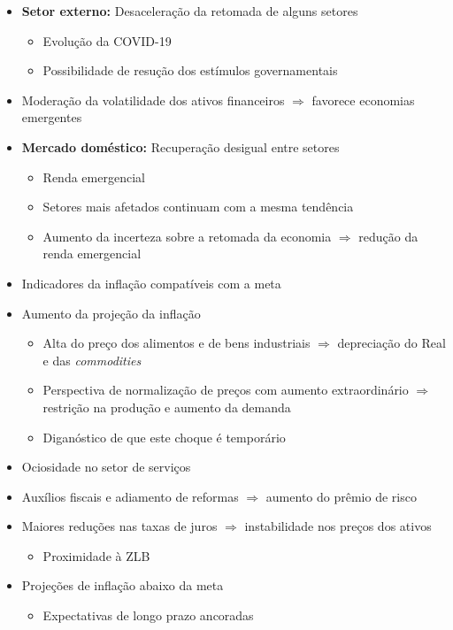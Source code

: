 \documentclass[11pt]{article}
\begin{document}
\begin{itemize}
\item \textbf{Setor externo:} Desaceleração da retomada de alguns setores
\begin{itemize}
\item Evolução da COVID-19
\item Possibilidade de resução dos estímulos governamentais
\end{itemize}
\item Moderação da volatilidade dos ativos financeiros \(\Rightarrow\) favorece economias emergentes
\item \textbf{Mercado doméstico:} Recuperação desigual entre setores
\begin{itemize}
\item Renda emergencial
\item Setores mais afetados continuam com a mesma tendência
\item Aumento da incerteza sobre a retomada da economia \(\Rightarrow\) redução da renda emergencial
\end{itemize}
\item Indicadores da inflação compatíveis com a meta
\item Aumento da projeção da inflação
\begin{itemize}
\item Alta do preço dos alimentos e de bens industriais \(\Rightarrow\) depreciação do Real e das \emph{commodities}
\item Perspectiva de normalização de preços com aumento extraordinário \(\Rightarrow\) restrição na produção e aumento da demanda
\item Diganóstico de que este choque é temporário
\end{itemize}
\item Ociosidade no setor de serviços
\item Auxílios fiscais e adiamento de reformas \(\Rightarrow\) aumento do prêmio de risco
\item Maiores reduções nas taxas de juros \(\Rightarrow\) instabilidade nos preços dos ativos
\begin{itemize}
\item Proximidade à ZLB
\end{itemize}
\item Projeções de inflação abaixo da meta
\begin{itemize}
\item Expectativas de longo prazo ancoradas
\end{itemize}
\end{itemize}
\end{document}
